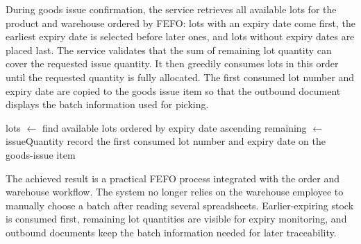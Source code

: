 During goods issue confirmation, the service retrieves all available lots for
the product and warehouse ordered by FEFO: lots with an expiry date come first,
the earliest expiry date is selected before later ones, and lots without expiry
dates are placed last. The service validates that the sum of remaining lot
quantity can cover the requested issue quantity. It then greedily consumes lots
in this order until the requested quantity is fully allocated. The first consumed
lot number and expiry date are copied to the goods issue item so that the
outbound document displays the batch information used for picking.

\begin{algorithm}[H]
\caption{FEFO allocation for a goods-issue item}
lots $\leftarrow$ find available lots ordered by expiry date ascending\;
remaining $\leftarrow$ issueQuantity\;
record the first consumed lot number and expiry date on the goods-issue item\;
\end{algorithm}

The achieved result is a practical FEFO process integrated with the order and
warehouse workflow. The system no longer relies on the warehouse employee to
manually choose a batch after reading several spreadsheets. Earlier-expiring
stock is consumed first, remaining lot quantities are visible for expiry
monitoring, and outbound documents keep the batch information needed for later
traceability.


